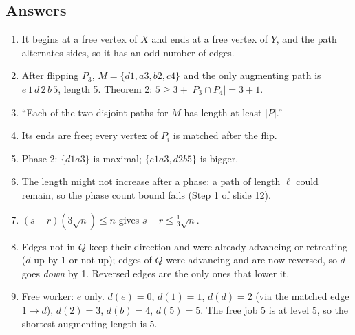 \documentclass[11pt,a4paper]{article}
\begin{document}
\subsection*{Answers}
\begin{enumerate}[label=\textbf{A\arabic*.},leftmargin=2.4em,itemsep=6pt]
\item It begins at a free vertex of $X$ and ends at a free vertex of $Y$, and the path alternates sides, so it has an odd number of edges.
\item After flipping $P_3$, $M=\{d1,a3,b2,c4\}$ and the only augmenting path is $e\,1\,d\,2\,b\,5$, length 5. Theorem 2: $5\ge3+|P_3\cap P_4|=3+1$.
\item ``Each of the two disjoint paths for $M$ has length at least $|P|$.''
\item Its ends are free; every vertex of $P_i$ is matched after the flip.
\item Phase 2: $\{d1a3\}$ is maximal; $\{e1a3,d2b5\}$ is bigger.
\item The length might not increase after a phase: a path of length $\ell$ could remain, so the phase count bound fails (Step 1 of slide 12).
\item $(s-r)(3\sqrt n)\le n$ gives $s-r\le\frac13\sqrt n$.
\item Edges not in $Q$ keep their direction and were already advancing or retreating ($d$ up by 1 or not up); edges of $Q$ were advancing and are now reversed, so $d$ goes \emph{down} by 1. Reversed edges are the only ones that lower it.
\item Free worker: $e$ only. $d(e)=0$, $d(1)=1$, $d(d)=2$ (via the matched edge $1\!\to\!d$), $d(2)=3$, $d(b)=4$, $d(5)=5$. The free job $5$ is at level 5, so the shortest augmenting length is 5.
\end{enumerate}
\end{document}
